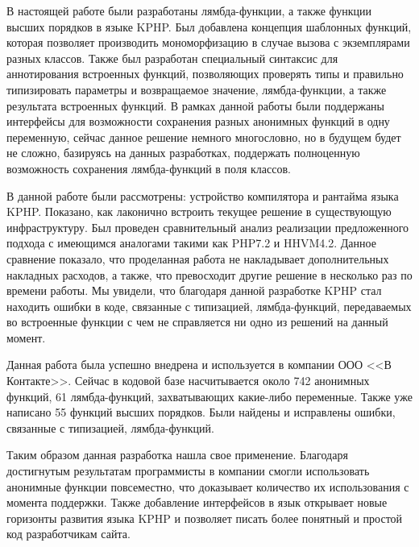 
\startconclusionpage
В настоящей работе были разработаны лямбда-функции, а также функции высших порядков в языке KPHP.
Был добавлена концепция шаблонных функций, которая позволяет производить мономорфизацию в случае вызова с экземплярами разных классов.
Также был разработан специальный синтаксис для аннотирования встроенных функций, позволяющих проверять типы и правильно типизировать параметры и возвращаемое значение, лямбда-функции, а также результата встроенных функций.
В рамках данной работы были поддержаны интерфейсы для возможности сохранения разных анонимных функций в одну переменную, сейчас данное решение немного многословно, но в будущем будет не сложно, базируясь на данных разработках, поддержать полноценную возможность сохранения лямбда-функций в поля классов.

В данной работе были рассмотрены: устройство компилятора и рантайма языка KPHP.
Показано, как лаконично встроить текущее решение в существующую инфраструктуру.
Был проведен сравнительный анализ реализации предложенного подхода с имеющимся аналогами такими как PHP7.2 и HHVM4.2.
Данное сравнение показало, что проделанная работа не накладывает дополнительных накладных расходов, а также, что превосходит другие решение в несколько раз по времени работы.
Мы увидели, что благодаря данной разработке KPHP стал находить ошибки в коде, связанные с типизацией, лямбда-функций, передаваемых во встроенные функции с чем не справляется ни одно из решений на данный момент.

Данная работа была успешно внедрена и используется в компании ООО <<В Контакте>>.
Сейчас в кодовой базе насчитывается около 742 анонимных функций, 61 лямбда-функций, захватывающих какие-либо переменные.
Также уже написано 55 функций высших порядков.
Были найдены и исправлены ошибки, связанные с типизацией, лямбда-функций.

Таким образом данная разработка нашла свое применение.
Благодаря достигнутым результатам программисты в компании смогли использовать анонимные функции повсеместно, что доказывает количество их использования с момента поддержки.
Также добавление интерфейсов в язык открывает новые горизонты развития языка KPHP и позволяет писать более понятный и простой код разработчикам сайта.

\printmainbibliography
